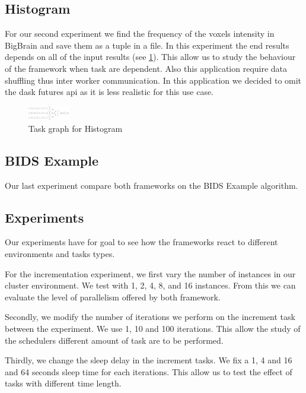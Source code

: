 \documentclass[11pt,a4paper]{article}
\begin{document}
\subsection{Histogram}
For our second experiment we find the frequency of the voxels intensity in BigBrain
and save them as a tuple in a file. In this experiment the end results depends on all
of the input results (see \ref{fig:tg-histo}). This allow us to study the behaviour
of the framework when task are dependent. Also this application require data
shuffling thus inter worker communication. In this application we decided to omit the
dask futures api as it is less realistic for this use case.

\begin{figure}[ht]
    \centering
    \includegraphics[width=0.16\textwidth, angle=-90]{images/histogram-task-graph.png}
    \caption{Task graph for Histogram}
    \label{fig:tg-histo}
\end{figure}

\subsection{BIDS Example}
Our last experiment compare both frameworks on the BIDS Example algorithm.

\subsection{Experiments}
Our experiments have for goal to see how the frameworks react to different
environments and tasks types.

For the incrementation experiment, we
first vary the number of instances in our cluster environment. We test with 1, 2, 4,
8, and 16 instances. From this we can evaluate the level of parallelism offered by
both framework.

Secondly, we modify the number of iterations we perform on the increment task between
the experiment. We use 1, 10 and 100 iterations. This allow the study of the
schedulers different amount of task are to be performed.

Thirdly, we change the sleep delay in the increment tasks. We fix a 1, 4 and 16 and
64 seconds sleep time for each iterations. This allow us to test the effect of tasks
with different time length.
\end{document}
